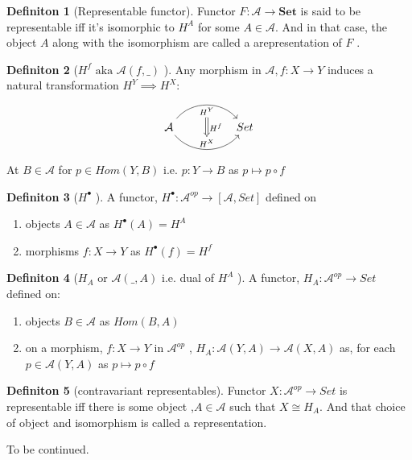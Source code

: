 \documentclass{article}
\theoremstyle{definition}
\theoremstyle{definition}
\newtheorem{definition}{Definiton}[section]
\theoremstyle{definition}
\theoremstyle{definition}
\begin{document}
\begin{definition}[Representable functor] %
	Functor $F:\mathcal{A} \rightarrow \textbf{Set}$ is said to be representable iff it's isomorphic to
	$H^A$ for some $A \in \mathcal{A} $. And in that case, the object $A$ along with the isomorphism
	are called a arepresentation of $F$ .
\end{definition}

\begin{definition}[$H^f \text{ aka } \mathcal{A} (f, \_)$ ] %
	Any morphism in $\mathcal{A}, f:X \rightarrow Y	$ induces a natural transformation $H^Y \implies H^X $:
	\[ 	\begin{tikzcd}[row sep=large, column sep=huge]
	\mathcal{ \mathcal{A} } \arrow[r,bend left=50, "H^Y"{name=U, below}]
	\arrow[r, bend right = 50, "H^X"{name=D, above}]
	& Set \arrow[Rightarrow, from=U , to=D, "H^f"]
		\end{tikzcd} \]
		At $B \in \mathcal{A} $ for $p \in Hom (Y,B) \text{ i.e. } p:Y \rightarrow B $ as
		$p \mapsto p \circ f$
\end{definition}

\begin{definition}[$H^\bullet$ ] %
	A functor, $H^\bullet : \mathcal{A} ^{op} \rightarrow [ \mathcal{A} , Set ] $ defined on
	\begin{enumerate}[label=\roman*]
		\item objects $A \in \mathcal{A} $ as $H^\bullet (A) = H^A$
		\item morphisms $f:X\rightarrow Y$ as $H^\bullet(f)=H^f$
	\end{enumerate}
\end{definition}

\begin{definition}[$H_A$ or $\mathcal{A} (\_,A)$  i.e. dual of $H^A$ ] %
	A functor, $H_A: \mathcal{A} ^{op} \rightarrow Set$ defined on:
	\begin{enumerate}[label=\roman*]
		\item objects $B \in \mathcal{A} $ as $Hom(B,A)$
		\item on a morphism, $f : X \rightarrow Y $ in $\mathcal{A}^{op} $ , $H_A: \mathcal{A} (Y,A) \rightarrow \mathcal{A}(X,A) $ as, for each $p \in \mathcal{A}(Y,A) $ as $p \mapsto p \circ f$
	\end{enumerate}
\end{definition}

\begin{definition}[contravariant representables] %
	Functor $X: \mathcal{A} ^{op} \rightarrow Set $ is representable iff there is some object ,$A \in \mathcal{A} $ such that $ X \cong H_A $. And that choice of object and isomorphism is called a representation.
\end{definition}





\pagebreak
To be continued.
\end{document}
